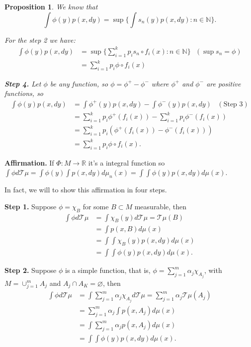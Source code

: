 \documentclass[a4paper]{article}
\theoremstyle{plain}
\newtheorem{prop} [theorem]{Proposition}
\theoremstyle{definition}
\begin{document}
\begin{prop}
    We know that 
    $$\int \phi(y) p(x,dy) = \sup \Big\{ \int s_n(y) p(x,dy): n \in \mathbb{N}\Big\}.$$

    For the step 2 we have:
    \begin{align*}
    \int \phi(y) p(x,dy) &= \sup \Big\{ \sum_{i=1}^{k} p_i s_n \circ f_i(x) : n \in \mathbb{N}\Big\} \,\,\,\,(\sup s_n = \phi)\\
    &= \sum_{i=1}^{k} p_i \phi \circ f_i(x)
    \end{align*}

    \textbf{Step 4.} Let $\phi$ be any function, so $\phi = \phi^+ - \phi^-$ where $\phi^+$ and $\phi^-$ are positive functions, so 
    \begin{align*}
     \int \phi(y) p(x,dy) &=\int \phi^+(y) p(x,dy) - \int \phi^-(y) p(x,dy) \,\,\,\,\,(\text{Step 3})\\
     &=\sum_{i=1}^{k} p_i \phi^+(f_i(x)) - \sum_{i=1}^{k} p_i \phi^-(f_i(x))\\
     &=\sum_{i=1}^{k}p_i ( \phi^+(f_i(x)) - \phi^-(f_i(x))) \\
     &= \sum_{i=1}^{k} p_i \phi \circ f_i(x).
    \end{align*}
    \end{prop}

    \textbf{Affirmation.} If $\Phi:M \to \mathbb{R}$ it's a integral function so 
    $\int \phi d\mathcal{T}\mu = \int \phi(y) \int p(x,dy) d\mu_n(x) = \int \int \phi(y) p(x,dy) d \mu(x).$

    In fact, we will to show this affirmation in four steps.

    \textbf{Step 1.} Suppose $\phi = \chi_B$ for some $B \subset M$ measurable, then 
    \begin{align*}
    \int \phi d\mathcal{T}\mu 
    &= \int \chi_B(y) d\mathcal{T}\mu = \mathcal{T}\mu(B) \\
    &= \int p(x,B) d\mu(x)\\
    &= \int \int \chi_B(y) p(x,dy) d\mu(x)\\
    &= \int \int \phi(y) p(x,dy) d\mu(x).
    \end{align*}

    \textbf{Step 2.} Suppose $\phi$ is a simple function, that is, 
    $\phi = \sum_{j=1}^{m} \alpha_j \chi_{A_j}$, with $M=\displaystyle\cup_{j=1}^{m} A_j$ and $A_j\cap A_K =\varnothing$, then
    \begin{align*}
    \int \phi d\mathcal{T}\mu 
    &= \int \sum_{j=1}^{m} \alpha_j \chi_{A_j} d\mathcal{T}\mu 
    = \sum_{j=1}^{m} \alpha_j \mathcal{T}\mu(A_j)  \\
    &=\sum_{j=1}^{m} \alpha_j \int p(x,A_j) d\mu(x)\\
    &= \int \sum_{j=1}^{m} \alpha_j p(x,A_j) d\mu(x)\\
    &= \int \int \phi(y) p(x,dy) d\mu(x).
    \end{align*}
\end{document}

